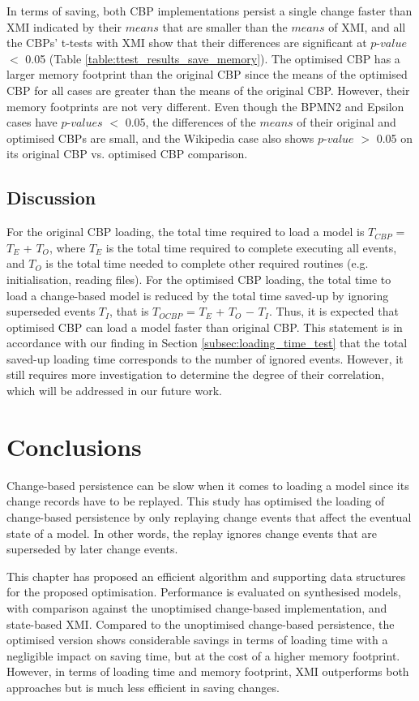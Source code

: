 {In terms of saving, both CBP implementations persist a single change faster than XMI indicated by their $means$ that are smaller than the $means$ of XMI, and all the CBPs' t-tests with XMI show that their differences are significant at $p$-$value$ $<$ 0.05 (Table \ref{table:ttest_results_save_memory}). The optimised CBP has a larger memory footprint than the original CBP since the means of the optimised CBP for all cases are greater than the means of the original CBP. However, their memory footprints are not very different. Even though the BPMN2 and Epsilon cases have $p$-$values$ $<$ 0.05, the differences of the $means$ of their original and optimised CBPs are small, and the Wikipedia case also shows $p$-$value$ $>$ 0.05 on its original CBP vs. optimised CBP comparison.   

\subsection{Discussion}
\label{sec:discussion}
For the original CBP loading, the total time required to load a model is $T_{CBP}$ = $T_E$ + $T_O$, where $T_E$ is the total time required to complete executing all events, and $T_O$ is the total time needed to complete other required routines (e.g. initialisation, reading files). For the optimised CBP loading, the total time to load a change-based model is reduced by the total time saved-up by ignoring superseded events $T_I$, that is $T_{OCBP}$ = $T_E$ + $T_O$ $-$ $T_I$. Thus, it is expected that optimised CBP can load a model faster than original CBP. This statement is in accordance with our finding in Section \ref{subsec:loading_time_test} that the total saved-up loading time corresponds to the number of ignored events. However, it still requires more investigation to determine the degree of their correlation, which will be addressed in our future work.

\section{Conclusions}
\label{sec:conclusions_4}
Change-based persistence can be slow when it comes to loading a model since its change records have to be replayed. This study has optimised the loading of change-based persistence by only replaying change events that affect the eventual state of a model. In other words, the replay ignores change events that are superseded by later change events.
 
This chapter has proposed an efficient algorithm and supporting data structures for the proposed optimisation. Performance is evaluated on synthesised models, with comparison against the unoptimised change-based implementation, and state-based XMI. Compared to the unoptimised change-based persistence, the optimised version shows considerable savings in terms of loading time with a negligible impact on saving time, but at the cost of a higher memory footprint. However, in terms of loading time and memory footprint, XMI outperforms both approaches but is much less efficient in saving changes. 

}
